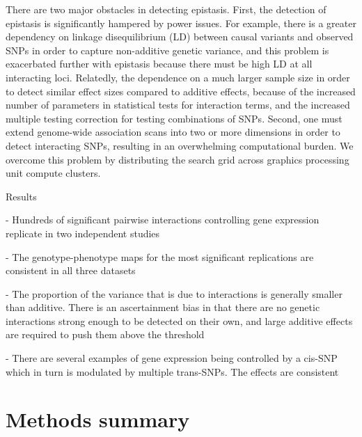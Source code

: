 \documentclass{article}
\begin{document}
There are two major obstacles in detecting epistasis. First, the detection of epistasis is significantly hampered by power issues. For example, there is a greater dependency on linkage disequilibrium (LD) between causal variants and observed SNPs in order to capture non-additive genetic variance, and this problem is exacerbated further with epistasis because there must be high LD at all interacting loci. Relatedly, the dependence on a much larger sample size in order to detect similar effect sizes compared to additive effects, because of the increased number of parameters in statistical tests for interaction terms, and the increased multiple testing correction for testing combinations of SNPs.  Second, one must extend genome-wide association scans into two or more dimensions in order to detect interacting SNPs, resulting in an overwhelming computational burden. We overcome this problem by distributing the search grid across graphics processing unit compute clusters.





Results


- Hundreds of significant pairwise interactions controlling gene expression replicate in two independent studies



- The genotype-phenotype maps for the most significant replications are consistent in all three datasets



- The proportion of the variance that is due to interactions is generally smaller than additive. There is an ascertainment bias in that there are no genetic interactions strong enough to be detected on their own, and large additive effects are required to push them above the threshold



- There are several examples of gene expression being controlled by a cis-SNP which in turn is modulated by multiple trans-SNPs. The effects are consistent 






\section{Methods summary}
\end{document}
